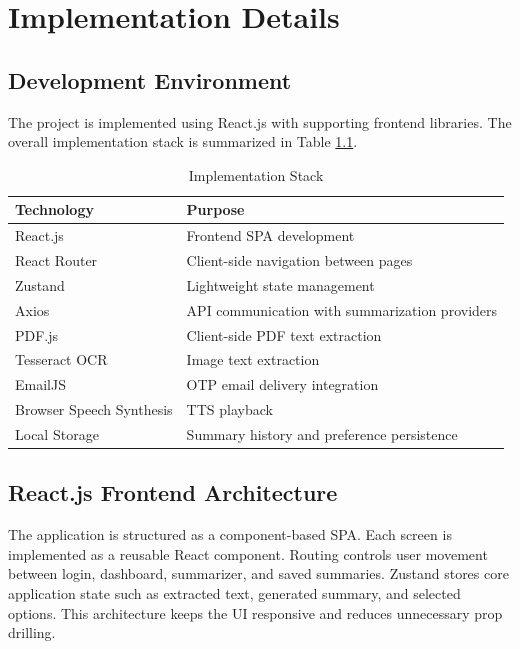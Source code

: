 \documentclass[12pt, a4paper]{report}
\begin{document}
\chapter{Implementation Details}


\section{Development Environment}
The project is implemented using React.js with supporting frontend libraries. The overall implementation stack is summarized in Table \ref{tab:stack}.

\begin{table}[H]
  \centering
  \caption{Implementation Stack}
  \label{tab:stack}
  \begin{tabular}{|p{3.5cm}|p{8.5cm}|}
    \hline
    \textbf{Technology} & \textbf{Purpose} \\
    \hline
    React.js & Frontend SPA development \\
    \hline
    React Router & Client-side navigation between pages \\
    \hline
    Zustand & Lightweight state management \\
    \hline
    Axios & API communication with summarization providers \\
    \hline
    PDF.js & Client-side PDF text extraction \\
    \hline
    Tesseract OCR & Image text extraction \\
    \hline
    EmailJS & OTP email delivery integration \\
    \hline
    Browser Speech Synthesis & TTS playback \\
    \hline
    Local Storage & Summary history and preference persistence \\
    \hline
  \end{tabular}
\end{table}

\section{React.js Frontend Architecture}
The application is structured as a component-based SPA. Each screen is implemented as a reusable React component. Routing controls user movement between login, dashboard, summarizer, and saved summaries. Zustand stores core application state such as extracted text, generated summary, and selected options. This architecture keeps the UI responsive and reduces unnecessary prop drilling.
\end{document}
